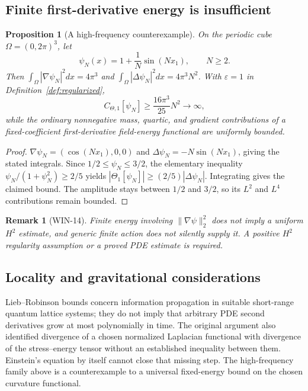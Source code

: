 \documentclass[11pt,a4paper]{article}
\newtheorem{proposition}[theorem]{Proposition}
\newtheorem{remark}[theorem]{Remark}
\begin{document}
\subsection{Finite first-derivative energy is insufficient}
\begin{proposition}[A high-frequency counterexample]
\label{prop:highfreq}
On the periodic cube $\Omega=(0,2\pi)^3$, let
\[
\psi_N(x)=1+\frac1N\sin(Nx_1),\qquad N\ge2.
\]
Then $\int_\Omega|\nabla\psi_N|^2dx=4\pi^3$ and
$\int_\Omega|\Delta\psi_N|^2dx=4\pi^3N^2$.
With $\varepsilon=1$ in Definition~\ref{def:regularized},
\[
C_{\Theta,1}[\psi_N]\ge\frac{16\pi^3}{25}N^2\longrightarrow\infty,
\]
while the ordinary nonnegative mass, quartic, and gradient contributions
of a fixed-coefficient first-derivative field-energy functional are
uniformly bounded.
\end{proposition}
\begin{proof}
$\nabla\psi_N=(\cos(Nx_1),0,0)$ and
$\Delta\psi_N=-N\sin(Nx_1)$, giving the stated integrals. Since
$1/2\le\psi_N\le3/2$, the elementary inequality
$\psi_N/(1+\psi_N^2)\ge2/5$ yields
$|\Theta_1[\psi_N]|\ge(2/5)|\Delta\psi_N|$.
Integrating gives the claimed bound. The amplitude stays between $1/2$
and $3/2$, so its $L^2$ and $L^4$ contributions remain bounded.
\end{proof}
\begin{remark}[WIN-14]
Finite energy involving $\|\nabla\psi\|_2^2$ does not imply a
uniform $H^2$ estimate, and generic finite action does not silently
supply it. A positive $H^2$ regularity assumption or a proved PDE
estimate is required.
\end{remark}

\subsection{Locality and gravitational considerations}
Lieb--Robinson bounds concern information propagation in suitable
short-range quantum lattice systems; they do not imply that arbitrary
PDE second derivatives grow at most polynomially in time. The original
argument also identified divergence of a chosen normalized Laplacian
functional with divergence of the stress--energy tensor without an
established inequality between them. Einstein's equation by itself
cannot close that missing step. The high-frequency family above is a
counterexample to a universal fixed-energy bound on the chosen curvature
functional.
\end{document}
